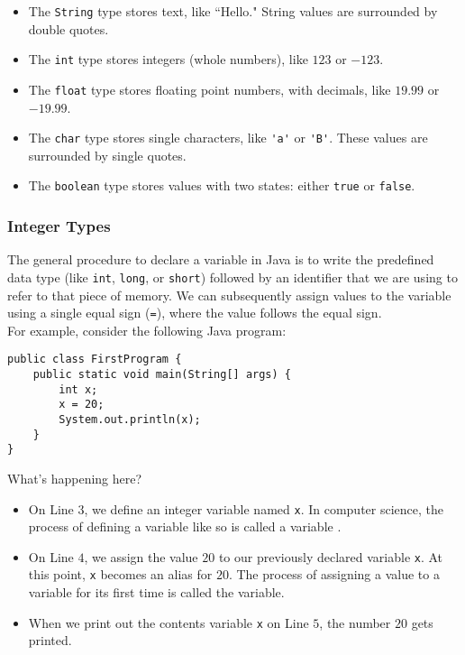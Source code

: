 \begin{itemize}
    \item The \verb!String! type stores text, like ``Hello." String values are surrounded by double quotes.
    \item The \verb!int! type stores integers (whole numbers), like $123$ or $-123$. 
    \item The \verb!float! type stores floating point numbers, with decimals, like $19.99$ or $-19.99$. 
    \item The \verb!char! type stores single characters, like \verb!'a'! or \verb!'B'!. These values are surrounded by single quotes.
    \item The \verb!boolean! type stores values with two states: either \verb!true! or \verb!false!.
\end{itemize}

\subsubsection{Integer Types}

The general procedure to declare a variable in Java is to write the predefined data type (like \verb!int!, \verb!long!, or \verb!short!) followed by an identifier that we are using to refer to that piece of memory. We can subsequently assign values to the variable using a single equal sign (\verb!=!), where the value follows the equal sign. \\

For example, consider the following Java program:

\begin{lstlisting}
public class FirstProgram {
    public static void main(String[] args) {
        int x;
        x = 20;
        System.out.println(x);
    }
}
\end{lstlisting}


What's happening here?

\begin{itemize}
    \item On Line $3$, we define an integer variable named \verb!x!. In computer science, the process of defining a variable like so is called a variable . 
    \item On Line $4$, we assign the value $20$ to our previously declared variable \verb!x!. At this point, \verb!x! becomes an alias for $20$. The process of assigning a value to a variable for its first time is called  the variable.
    \item When we print out the contents variable \verb!x! on Line $5$, the number $20$ gets printed.
\end{itemize}

